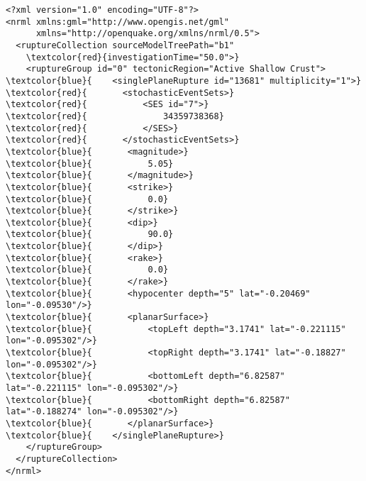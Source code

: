 \begin{Verbatim}[frame=single, commandchars=\\\{\}, fontsize=\small]
<?xml version="1.0" encoding="UTF-8"?>
<nrml xmlns:gml="http://www.opengis.net/gml"
	  xmlns="http://openquake.org/xmlns/nrml/0.5">
  <ruptureCollection sourceModelTreePath="b1"
    \textcolor{red}{investigationTime="50.0">}
    <ruptureGroup id="0" tectonicRegion="Active Shallow Crust">
\textcolor{blue}{    <singlePlaneRupture id="13681" multiplicity="1">}
\textcolor{red}{       <stochasticEventSets>}
\textcolor{red}{           <SES id="7">}
\textcolor{red}{               34359738368}
\textcolor{red}{           </SES>}
\textcolor{red}{       </stochasticEventSets>}
\textcolor{blue}{       <magnitude>}
\textcolor{blue}{           5.05}
\textcolor{blue}{       </magnitude>}
\textcolor{blue}{       <strike>}
\textcolor{blue}{           0.0}
\textcolor{blue}{       </strike>}
\textcolor{blue}{       <dip>}
\textcolor{blue}{           90.0}
\textcolor{blue}{       </dip>}
\textcolor{blue}{       <rake>}
\textcolor{blue}{           0.0}
\textcolor{blue}{       </rake>}
\textcolor{blue}{       <hypocenter depth="5" lat="-0.20469" lon="-0.09530"/>}
\textcolor{blue}{       <planarSurface>}
\textcolor{blue}{           <topLeft depth="3.1741" lat="-0.221115" lon="-0.095302"/>}
\textcolor{blue}{           <topRight depth="3.1741" lat="-0.18827" lon="-0.095302"/>}
\textcolor{blue}{           <bottomLeft depth="6.82587" lat="-0.221115" lon="-0.095302"/>}
\textcolor{blue}{           <bottomRight depth="6.82587" lat="-0.188274" lon="-0.095302"/>}
\textcolor{blue}{       </planarSurface>}
\textcolor{blue}{    </singlePlaneRupture>}
    </ruptureGroup>
  </ruptureCollection>
</nrml>
\end{Verbatim}
